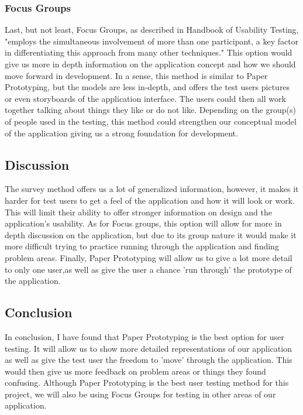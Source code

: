 \documentclass[compsoc, 10, draftclsnofoot, onecolumn]{IEEEtran}
\begin{document}
\subsubsection{Focus Groups} Last, but not least, Focus Groups, as described in Handbook of Usability Testing, "employs the simultaneous involvement of more than one participant, a key factor in differentiating this approach from many other techniques." This option would give us more in depth information on the application concept and how we should move forward in development. In a sense, this method is similar to Paper Prototyping, but the models are less in-depth, and offers the test users pictures or even storyboards of the application interface. The users could then all work together talking about things they like or do not like. Depending on the group(s) of people used in the testing, this method could strengthen our conceptual model of the application giving us a strong foundation for development.  
\subsection{Discussion} The survey method offers us a lot of generalized information, however, it makes it harder for test users to get a feel of the application and how it will look or work. This will limit their ability to offer stronger information on design and the application's usability. As for Focus groups, this option will allow for more in depth discussion on the application, but due to its group nature it would make it more difficult trying to practice running through the application and finding problem areas. Finally, Paper Prototyping will allow us to give a lot more detail to only one user,as well as give the user a chance 'run through' the prototype of the application. 
\subsection{Conclusion} In conclusion, I have found that Paper Prototyping is the best option for user testing. It will allow us to show more detailed representations of our application as well as give the test user the freedom to 'move' through the application. This would then give us more feedback on problem areas or things they found confusing. Although Paper Prototyping is the best user testing method for this project, we will also be using Focus Groups for testing in other areas of our application.   

\clearpage


\end{document}

